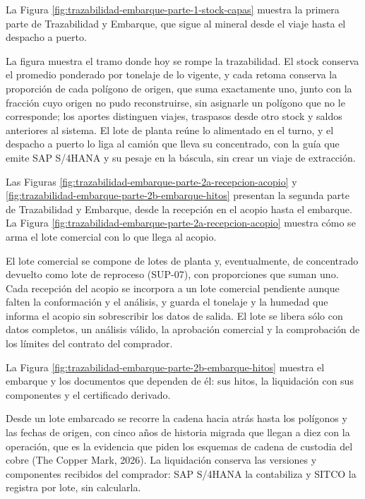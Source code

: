 \documentclass[subdoc]{../../comun/overfore}
\begin{document}
La Figura \ref{fig:trazabilidad-embarque-parte-1-stock-capas} muestra la primera parte de Trazabilidad y Embarque, que sigue al mineral desde el viaje hasta el despacho a puerto.

La figura muestra el tramo donde hoy se rompe la trazabilidad. El stock conserva el promedio ponderado por tonelaje de lo vigente, y cada retoma conserva la proporción de cada polígono de origen, que suma exactamente uno, junto con la fracción cuyo origen no pudo reconstruirse, sin asignarle un polígono que no le corresponde; los aportes distinguen viajes, traspasos desde otro stock y saldos anteriores al sistema. El lote de planta reúne lo alimentado en el turno, y el despacho a puerto lo liga al camión que lleva su concentrado, con la guía que emite SAP S/4HANA y su pesaje en la báscula, sin crear un viaje de extracción.

Las Figuras \ref{fig:trazabilidad-embarque-parte-2a-recepcion-acopio} y \ref{fig:trazabilidad-embarque-parte-2b-embarque-hitos} presentan la segunda parte de Trazabilidad y Embarque, desde la recepción en el acopio hasta el embarque. La Figura \ref{fig:trazabilidad-embarque-parte-2a-recepcion-acopio} muestra cómo se arma el lote comercial con lo que llega al acopio.

El lote comercial se compone de lotes de planta y, eventualmente, de concentrado devuelto como lote de reproceso (SUP-07), con proporciones que suman uno. Cada recepción del acopio se incorpora a un lote comercial pendiente aunque falten la conformación y el análisis, y guarda el tonelaje y la humedad que informa el acopio sin sobrescribir los datos de salida. El lote se libera sólo con datos completos, un análisis válido, la aprobación comercial y la comprobación de los límites del contrato del comprador.

La Figura \ref{fig:trazabilidad-embarque-parte-2b-embarque-hitos} muestra el embarque y los documentos que dependen de él: sus hitos, la liquidación con sus componentes y el certificado derivado.

Desde un lote embarcado se recorre la cadena hacia atrás hasta los polígonos y las fechas de origen, con cinco años de historia migrada que llegan a diez con la operación, que es la evidencia que piden los esquemas de cadena de custodia del cobre (The Copper Mark, 2026). La liquidación conserva las versiones y componentes recibidos del comprador: SAP S/4HANA la contabiliza y SITCO la registra por lote, sin calcularla.
\end{document}
